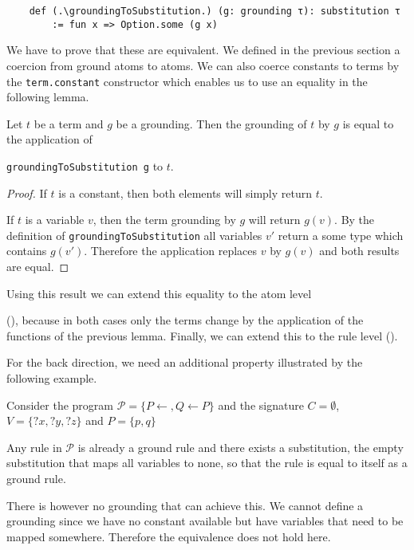     \begin{lstlisting}
    def (.\groundingToSubstitution.) (g: grounding τ): substitution τ
        := fun x => Option.some (g x)
    \end{lstlisting}

    We have to prove that these are equivalent. We defined in the previous section a coercion from ground atoms to atoms. We can also coerce constants to terms by the \lstinline|term.constant| constructor which enables us to use an equality in the following lemma.

    \begin{lemma}[\groundingToSubsitutionEquivTerm]
        Let $t$ be a term and $g$ be a grounding. Then the grounding of $t$ by $g$ is equal to the application of
        
        \lstinline|groundingToSubstitution g| to $t$.
    \end{lemma}
    \begin{proof}
        If $t$ is a constant, then both elements will simply return $t$.

        If $t$ is a variable $v$, then the term grounding by $g$ will return $g(v)$. By the definition of \lstinline|groundingToSubstitution| all variables $v'$ return a some type which contains $g(v')$. Therefore the application replaces $v$ by $g(v)$ and both results are equal. 
    \end{proof}

    Using this result we can extend this equality to the atom level 
    
    (\groundingToSubsitutionEquivAtom), because in both cases only the terms change by the application of the functions of the previous lemma. Finally, we can extend this to the rule level (\groundingToSubsitutionEquivRule).

    For the back direction, we need an additional property illustrated by the following example.
    \begin{example}
        Consider the program $\mathcal{P} = \{P \leftarrow, Q \leftarrow P\}$ and the signature $C = \emptyset$, $V = \{?x,?y,?z \}$ and $P = \{p,q\}$

        Any rule in $\mathcal{P}$ is already a ground rule and there exists a substitution, the empty substitution that maps all variables to none, so that the rule is equal to itself as a ground rule.
        
        There is however no grounding that can achieve this. We cannot define a grounding since we have no constant available but have variables that need to be mapped somewhere. Therefore the equivalence does not hold here.
    \end{example}

